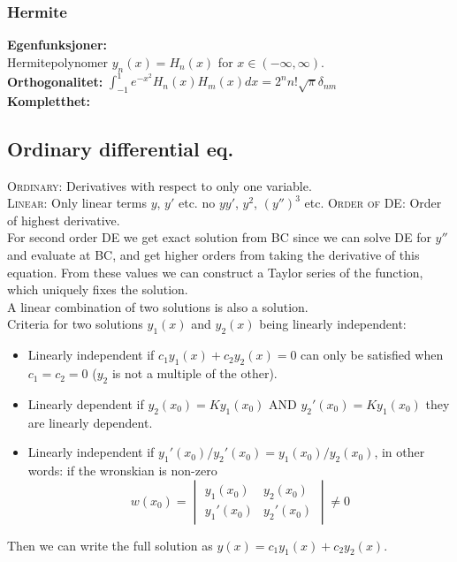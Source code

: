 \documentclass[a4paper, 10pt]{article}
\begin{document}
\begin{multicols*}{3}
\subsubsection*{\small Hermite}
\textbf{Egenfunksjoner:}\\
Hermitepolynomer $y_n(x)=H_n(x)$ for $x\in(-\infty,\infty)$. \\
\textbf{Orthogonalitet: }
$\int_{-1}^1 e^{-x^2}H_n(x)H_m(x)dx=2^n n! \sqrt{\pi}\delta_{nm}$ \\
\textbf{Kompletthet:} 

\newpage

\begin{mdframed}
\subsection*{Ordinary differential eq.}
\end{mdframed}
\textsc{Ordinary:} Derivatives with respect to only one variable.\\
\textsc{Linear:} Only linear terms $y$, $y'$ etc. no $yy'$, $y^2$, $(y'')^3$ etc.
\textsc{Order of DE:} Order of highest derivative.\\
For second order DE we get exact solution from BC since we can solve DE for $y''$ and evaluate at BC, and get higher orders from taking the derivative of this equation. From these values we can construct a Taylor series of the function, which uniquely fixes the solution.\\
A linear combination of two solutions is also a solution.\\
Criteria for two solutions $y_1(x)$ and $y_2(x)$ being linearly independent:
\begin{itemize}
  \item Linearly independent if $c_1y_1(x) + c_2y_2(x) = 0$ can only be satisfied when $c_1 = c_2=0$ ($y_2$ is not a multiple of the other).
  \item Linearly dependent if $y_2(x_0) = Ky_1(x_0)$ AND $y_2'(x_0) = Ky_1(x_0)$ they are linearly dependent.
  \item Linearly independent if $y_1'(x_0)/y_2'(x_0) = y_1(x_0)/y_2(x_0)$, in other words: if the wronskian is non-zero $$ w(x_0) = \begin{vmatrix}
  y_1(x_0)  & y_2(x_0)\\
  y_1'(x_0) & y_2'(x_0)
  \end{vmatrix} \neq 0$$
\end{itemize}
Then we can write the full solution as $y(x)=c_1y_1(x) + c_2y_2(x)$.

\end{multicols*}
\end{document}
